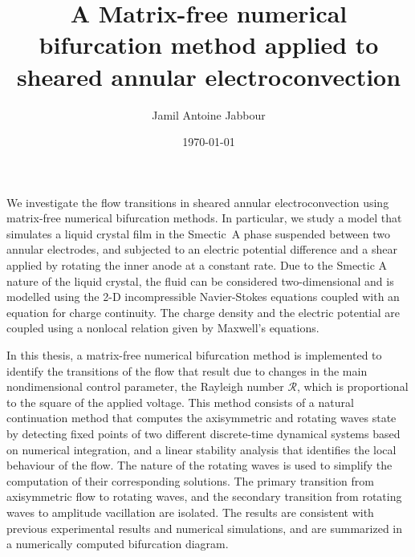 \makepreliminaries

\figurespagetrue
\tablespagetrue

\title{A Matrix-free numerical bifurcation method applied to sheared annular electroconvection}
\author{Jamil Antoine Jabbour}
\date{\today}
\titlepage

We investigate the flow transitions in sheared annular electroconvection using {matrix-free} numerical bifurcation methods. In particular, we study a model that simulates a liquid crystal film in the Smectic~A phase suspended between two annular electrodes, and subjected to an electric potential difference and a shear applied by rotating the inner anode at a constant rate.
Due to the Smectic A nature of the liquid crystal, the fluid can be considered two-dimensional and is modelled using the 2-D incompressible {Navier-Stokes} equations coupled with an equation for charge continuity. The charge density and the electric potential are coupled using a nonlocal relation given by Maxwell's equations.

In this thesis, a {matrix-free} numerical bifurcation method is implemented to identify the transitions of the flow that result due to changes in the main nondimensional control parameter, the Rayleigh number $\mathcal{R}$, which is proportional to the square of the applied voltage. %
This method consists of a natural continuation method that computes the axisymmetric and rotating waves state by detecting fixed points of two different discrete-time dynamical systems based on numerical integration, and a linear stability analysis that identifies the local behaviour of the flow.
The nature of the rotating waves is used to simplify the computation of their corresponding solutions.
The primary transition from axisymmetric flow to rotating waves, and the secondary transition from rotating waves to amplitude vacillation are isolated. The results are consistent with previous experimental results and numerical simulations, and are summarized in a numerically computed bifurcation diagram.

